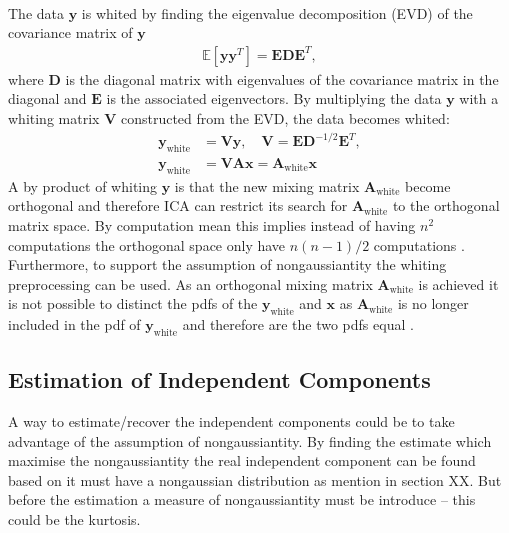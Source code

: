 \\
The data $\mathbf{y}$ is whited by finding the eigenvalue decomposition (EVD) of the covariance matrix of $\mathbf{y}$
\begin{align*}
\mathbb{E}[\mathbf{yy}^T] = \mathbf{EDE}^T,
\end{align*}
where $\mathbf{D}$ is the diagonal matrix with eigenvalues of the covariance matrix in the diagonal and $\mathbf{E}$ is the associated eigenvectors. By multiplying the data $\mathbf{y}$ with a whiting matrix $\mathbf{V}$ constructed from the EVD, the data becomes whited:
\begin{align}
\mathbf{y}_{\text{white}} &= \mathbf{Vy}, \quad \mathbf{V} = \mathbf{ED}^{-1/2} \mathbf{E}^T, \\
\mathbf{y}_{\text{white}} &= \mathbf{VAx} = \mathbf{A}_{\text{white}} \mathbf{x} \nonumber
\end{align}
A by product of whiting $\mathbf{y}$ is that the new mixing matrix $\mathbf{A}_{\text{white}}$ become orthogonal and therefore ICA can restrict its search for $\mathbf{A}_{\text{white}}$ to the orthogonal matrix space. By computation mean this implies instead of having $n^2$ computations the orthogonal space only have $n(n-1)/2$ computations \cite[p. 159]{ICA}.
\\
Furthermore, to support the assumption of nongaussiantity the whiting preprocessing can be used. As an orthogonal mixing matrix $\mathbf{A}_{\text{white}}$ is achieved it is not possible to distinct the pdfs of the $\mathbf{y}_{\text{white}}$ and $\mathbf{x}$ as $\mathbf{A}_{\text{white}}$ is no longer included in the pdf of $\mathbf{y}_{\text{white}}$ and therefore are the two pdfs equal \cite[p. 161-163]{ICA}.

\subsection{Estimation of Independent Components}
A way to estimate/recover the independent components could be to take advantage of the assumption of nongaussiantity. By finding the estimate which maximise the nongaussiantity the real independent component can be found based on it must have a nongaussian distribution as mention in section XX. But before the estimation a measure of nongaussiantity must be introduce -- this could be the kurtosis.

